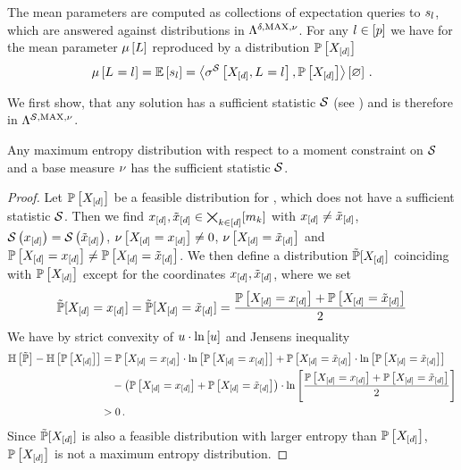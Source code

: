 The mean parameters are computed as collections of expectation queries to $s_{l}$, which are answered against distributions in $\Lambda^{\delta,\mathrm{MAX},\nu}$.
For any $l\in[p]$ we have for the mean parameter $\mu\left[L\right]$ reproduced by a distribution $\mathbb{P}\left[X_{[d]}\right]$
\begin{align*}
    \mu\left[L_{}=l_{}\right]
    = \mathbb{E}\left[s_{l}\right]
    = \left\langle \sigma^{\mathcal{S}}\left[X_{[d]},L_{}=l_{}\right],\mathbb{P}\left[X_{[d]}\right]\right\rangle \left[ \varnothing \right] \, .
\end{align*}

We first show, that any solution has a sufficient statistic $\mathcal{S}$ (see ) and is therefore in $\Lambda^{\mathcal{S},\mathrm{MAX},\nu}$.

\begin{theorem}
    \label{the:maxEntWithSufficientStatistic}
    Any maximum entropy distribution with respect to a moment constraint on $\mathcal{S}$ and a base measure $\nu$ has the sufficient statistic $\mathcal{S}$.
\end{theorem}
\begin{proof}
    Let $\mathbb{P}\left[X_{[d]}\right]$ be a feasible distribution for , which does not have a sufficient statistic $\mathcal{S}$.
    Then we find $x_{[d]},\tilde{x}_{[d]}\in\bigtimes_{k\in[d]}[m_{k}]$ with $x_{[d]}\neq\tilde{x}_{[d]}$, $\mathcal{S}\left(x_{[d]}\right)=\mathcal{S}\left(\tilde{x}_{[d]}\right)$, $\nu\left[X_{[d]}=x_{[d]}\right]\neq0$, $\nu\left[X_{[d]}=\tilde{x}_{[d]}\right]$ and $\mathbb{P}\left[X_{[d]}=x_{[d]}\right]\neq\mathbb{P}\left[X_{[d]}=\tilde{x}_{[d]}\right]$.
    We then define a distribution $\tilde{\mathbb{P}}[X_{[d]}]$ coinciding with $\mathbb{P}\left[X_{[d]}\right]$ except for the coordinates $x_{[d]},\tilde{x}_{[d]}$, where we set
    \begin{align*}
        \tilde{\mathbb{P}}[X_{[d]}=x_{[d]}] = \tilde{\mathbb{P}}[X_{[d]}=\tilde{x}_{[d]}] = \frac{\mathbb{P}\left[X_{[d]}=x_{[d]}\right]+\mathbb{P}\left[X_{[d]}=\tilde{x}_{[d]}\right]}{2}
    \end{align*}
    We have by strict convexity of $u\cdot\ln \left[ u \right]$ and Jensens inequality
    \begin{align*}
        \mathbb{H}\left[\tilde{\mathbb{P}}\right] -  \mathbb{H}\left[\mathbb{P}\left[X_{[d]}\right]\right]
        &= \mathbb{P}\left[X_{[d]}=x_{[d]}\right] \cdot \ln \left[ \mathbb{P}\left[X_{[d]}=x_{[d]}\right] \right]
        + \mathbb{P}\left[X_{[d]}=\tilde{x}_{[d]}\right] \cdot \ln \left[ \mathbb{P}\left[X_{[d]}=\tilde{x}_{[d]}\right] \right] \\
        & \quad  - \left(\mathbb{P}\left[X_{[d]}=x_{[d]}\right]+\mathbb{P}\left[X_{[d]}=\tilde{x}_{[d]}\right]\right) \cdot \ln \left[ \frac{\mathbb{P}\left[X_{[d]}=x_{[d]}\right]+\mathbb{P}\left[X_{[d]}=\tilde{x}_{[d]}\right]}{2} \right] \\
        & > 0 \, .
    \end{align*}
    Since $\tilde{\mathbb{P}}[X_{[d]}]$ is also a feasible distribution with larger entropy than $\mathbb{P}\left[X_{[d]}\right]$, $\mathbb{P}\left[X_{[d]}\right]$ is not a maximum entropy distribution.
\end{proof}

